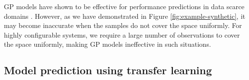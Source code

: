 GP models have shown to be effective for performance predictions in data scarce domains \cite{jamshidi2016bo4co}. However, as we have demonstrated in Figure \ref{fig:example-synthetic}, it may become inaccurate when the samples do not cover the space uniformly. For highly configurable systems, we require a large number of observations to cover the space uniformly, making GP models ineffective in such situations.

\subsection{Model prediction using transfer learning}
\label{sec:tl}




